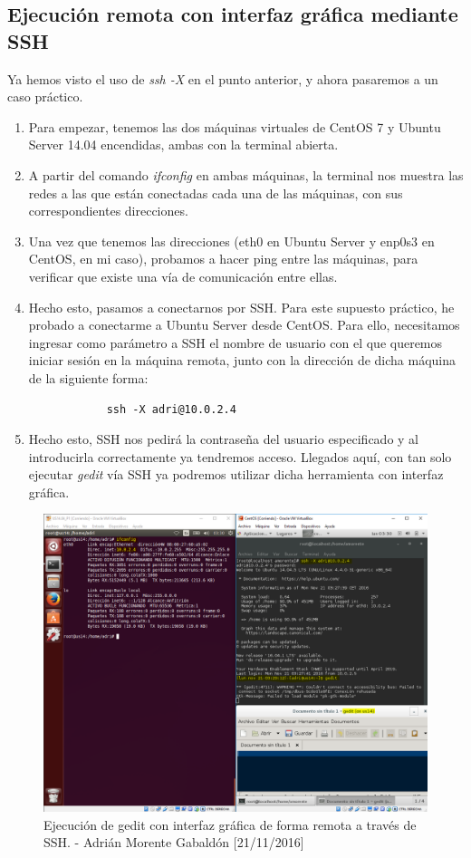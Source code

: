 	\subsection{Ejecución remota con interfaz gráfica mediante SSH}
	Ya hemos visto el uso de \emph{ssh -X} en el punto anterior, y ahora pasaremos a un caso práctico. 
	\begin{enumerate}[1.]
		\item Para empezar, tenemos las dos máquinas virtuales de CentOS 7 y Ubuntu Server 14.04 encendidas, ambas con la terminal abierta.
		\item A partir del comando \emph{ifconfig} en ambas máquinas, la terminal nos muestra las redes a las que están conectadas cada una de las máquinas, con sus correspondientes direcciones.
		\item Una vez que tenemos las direcciones (eth0 en Ubuntu Server y enp0s3 en CentOS, en mi caso), probamos a hacer ping entre las máquinas, para verificar que existe una vía de comunicación entre ellas.
		\item Hecho esto, pasamos a conectarnos por SSH. Para este supuesto práctico, he probado a conectarme a Ubuntu Server desde CentOS. Para ello, necesitamos ingresar como parámetro a SSH el nombre de usuario con el que queremos iniciar sesión en la máquina remota, junto con la dirección de dicha máquina de la siguiente forma:
		\begin{verbatim}
			ssh -X adri@10.0.2.4
		\end{verbatim}
		\item Hecho esto, SSH nos pedirá la contraseña del usuario especificado y al introducirla correctamente ya tendremos acceso. Llegados aquí, con tan solo ejecutar \emph{gedit} vía SSH ya podremos utilizar dicha herramienta con interfaz gráfica.
	\end{enumerate}
	\begin{figure}[H]
		\centering
		\includegraphics[scale=0.4]{ssh-X}
		\caption{Ejecución de gedit con interfaz gráfica de forma remota a través de SSH. - Adrián Morente Gabaldón [21/11/2016]}
		\label{fig:figura6}
	\end{figure}



